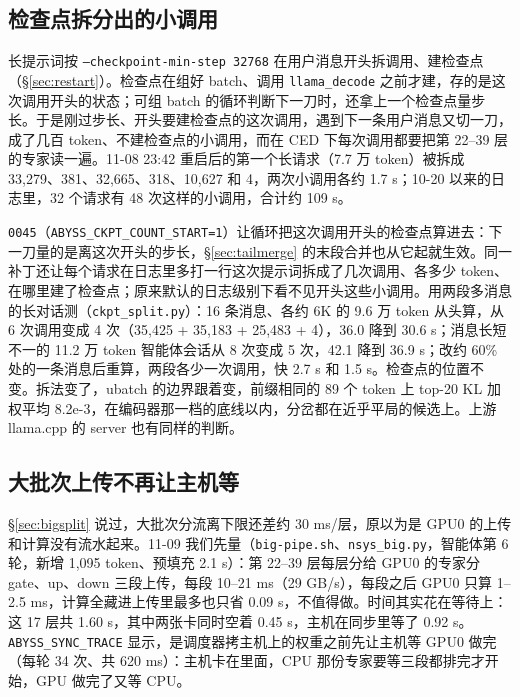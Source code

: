 \documentclass[11pt,a4paper]{article}
\newcommand{\code}[1]{\texttt{#1}}
\begin{document}
\subsection{检查点拆分出的小调用}
\label{sec:ckptsplit}

长提示词按 \code{--checkpoint-min-step 32768} 在用户消息开头拆调用、建检查点（\S\ref{sec:restart}）。检查点在组好 batch、调用 \code{llama\_decode} 之前才建，存的是这次调用开头的状态；可组 batch 的循环判断下一刀时，还拿上一个检查点量步长。于是刚过步长、开头要建检查点的这次调用，遇到下一条用户消息又切一刀，成了几百 token、不建检查点的小调用，而在 CED 下每次调用都要把第 22--39 层的专家读一遍。11-08 23:42 重启后的第一个长请求（7.7 万 token）被拆成 33,279、381、32,665、318、10,627 和 4，两次小调用各约 1.7 s；10-20 以来的日志里，32 个请求有 48 次这样的小调用，合计约 109 s。

\code{0045}（\code{ABYSS\_CKPT\_COUNT\_START=1}）让循环把这次调用开头的检查点算进去：下一刀量的是离这次开头的步长，\S\ref{sec:tailmerge} 的末段合并也从它起就生效。同一补丁还让每个请求在日志里多打一行这次提示词拆成了几次调用、各多少 token、在哪里建了检查点；原来默认的日志级别下看不见开头这些小调用。用两段多消息的长对话测（\code{ckpt\_split.py}）：16 条消息、各约 6K 的 9.6 万 token 从头算，从 6 次调用变成 4 次（35,425 + 35,183 + 25,483 + 4），36.0 降到 30.6 s；消息长短不一的 11.2 万 token 智能体会话从 8 次变成 5 次，42.1 降到 36.9 s；改约 60\% 处的一条消息后重算，两段各少一次调用，快 2.7 s 和 1.5 s。检查点的位置不变。拆法变了，ubatch 的边界跟着变，前缀相同的 89 个 token 上 top-20 KL 加权平均 8.2e-3，在编码器那一档的底线以内，分岔都在近乎平局的候选上。上游 llama.cpp 的 server 也有同样的判断。

\subsection{大批次上传不再让主机等}
\label{sec:nowait}

\S\ref{sec:bigsplit} 说过，大批次分流离下限还差约 30 ms/层，原以为是 GPU0 的上传和计算没有流水起来。11-09 我们先量（\code{big-pipe.sh}、\code{nsys\_big.py}，智能体第 6 轮，新增 1,095 token、预填充 2.1 s）：第 22--39 层每层分给 GPU0 的专家分 gate、up、down 三段上传，每段 10--21 ms（29 GB/s），每段之后 GPU0 只算 1--2.5 ms，计算全藏进上传里最多也只省 0.09 s，不值得做。时间其实花在等待上：这 17 层共 1.60 s，其中两张卡同时空着 0.45 s，主机在同步里等了 0.92 s。\code{ABYSS\_SYNC\_TRACE} 显示，是调度器拷主机上的权重之前先让主机等 GPU0 做完（每轮 34 次、共 620 ms）：主机卡在里面，CPU 那份专家要等三段都排完才开始，GPU 做完了又等 CPU。
\end{document}
